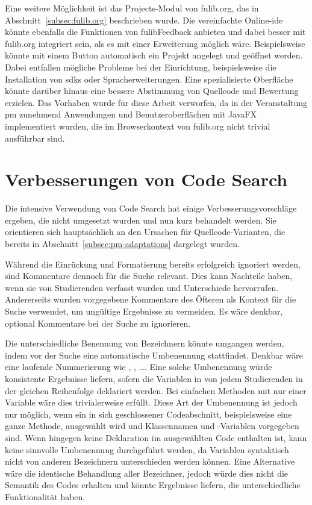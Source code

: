 Eine weitere Möglichkeit ist das Projects-Modul von fulib.org, das in Abschnitt~\ref{subsec:fulib.org} beschrieben wurde.
Die vereinfachte Online-\ac{ide} könnte ebenfalls die Funktionen von fulibFeedback anbieten und dabei besser mit fulib.org integriert sein, als es mit einer Erweiterung möglich wäre.
Beispielsweise könnte mit einem Button automatisch ein Projekt angelegt und geöffnet werden.
Dabei entfallen mögliche Probleme bei der Einrichtung, beispielsweise die Installation von \acp{sdk} oder Spracherweiterungen.
Eine spezialisierte Oberfläche könnte darüber hinaus eine bessere Abstimmung von Quellcode und Bewertung erzielen.
Das Vorhaben wurde für diese Arbeit verworfen, da in der Veranstaltung \ac{pm} zunehmend Anwendungen und Benutzeroberflächen mit JavaFX implementiert wurden, die im Browserkontext von fulib.org nicht trivial ausführbar sind.

\section{Verbesserungen von Code Search}\label{sec:code-search-improvements}

Die intensive Verwendung von Code Search hat einige Verbesserungsvorschläge ergeben, die nicht umgesetzt wurden und nun kurz behandelt werden.
Sie orientieren sich hauptsächlich an den Ursachen für Quellcode-Varianten, die bereits in Abschnitt~\ref{subsec:pm-adaptations} dargelegt wurden.

Während die Einrückung und Formatierung bereits erfolgreich ignoriert werden, sind Kommentare dennoch für die Suche relevant.
Dies kann Nachteile haben, wenn sie von Studierenden verfasst wurden und Unterschiede hervorrufen.
Andererseits wurden vorgegebene Kommentare des Öfteren als Kontext für die Suche verwendet, um ungültige Ergebnisse zu vermeiden.
Es wäre denkbar, optional Kommentare bei der Suche zu ignorieren.

Die unterschiedliche Benennung von Bezeichnern könnte umgangen werden, indem vor der Suche eine automatische Umbenennung stattfindet.
Denkbar wäre eine laufende Nummerierung wie , , \ldots.
Eine solche Umbenennung würde konsistente Ergebnisse liefern, sofern die Variablen in von jedem Studierenden in der gleichen Reihenfolge deklariert werden.
Bei einfachen Methoden mit nur einer Variable wäre dies trivialerweise erfüllt.
Diese Art der Umbenennung ist jedoch nur möglich, wenn ein in sich geschlossener Codeabschnitt, beispielsweise eine ganze Methode, ausgewählt wird und Klassennamen und -Variablen vorgegeben sind.
Wenn hingegen keine Deklaration im ausgewählten Code enthalten ist, kann keine sinnvolle Umbenennung durchgeführt werden, da Variablen syntaktisch nicht von anderen Bezeichnern unterschieden werden können.
Eine Alternative wäre die identische Behandlung aller Bezeichner, jedoch würde dies nicht die Semantik des Codes erhalten und könnte Ergebnisse liefern, die unterschiedliche Funktionalität haben.

